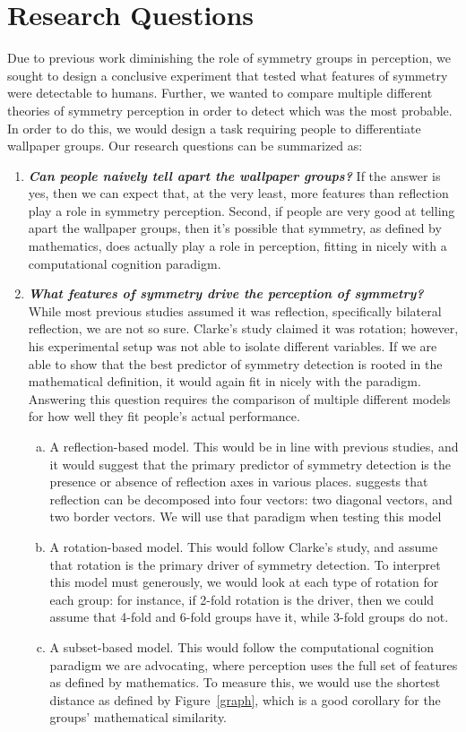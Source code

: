 \section{Research Questions}
Due to previous work diminishing the role of symmetry groups in perception, we sought to design a conclusive experiment that tested what features of symmetry were detectable to humans. Further, we wanted to compare multiple different theories of symmetry perception in order to detect which was the most probable. In order to do this, we would design a task requiring people to differentiate wallpaper groups. Our research questions can be summarized as:

\begin{enumerate}
\item {\textbf{\textit{Can people naively tell apart the wallpaper groups?}} If the answer is yes, then we can expect that, at the very least, more features than reflection play a role in symmetry perception. Second, if people are very good at telling apart the wallpaper groups, then it's possible that symmetry, as defined by mathematics, does actually play a role in perception, fitting in nicely with a computational cognition paradigm.}
\item {\textbf{\textit{What features of symmetry drive the perception of symmetry?}} While most previous studies assumed it was reflection, specifically bilateral reflection, we are not so sure. Clarke's study claimed it was rotation; however, his experimental setup was not able to isolate different variables. If we are able to show that the best predictor of symmetry detection is rooted in the mathematical definition, it would again fit in nicely with the paradigm. Answering this question requires the comparison of multiple different models for how well they fit people's actual performance.}
\begin{enumerate}[a.]
\item {A reflection-based model. This would be in line with previous studies, and it would suggest that the primary predictor of symmetry detection is the presence or absence of reflection axes in various places. \citet{yanxibook} suggests that reflection can be decomposed into four vectors: two diagonal vectors, and two border vectors. We will use that paradigm when testing this model}
\item {A rotation-based model. This would follow Clarke's study, and assume that rotation is the primary driver of symmetry detection. To interpret this model must generously, we would look at each type of rotation for each group: for instance, if 2-fold rotation is the driver, then we could assume that 4-fold and 6-fold groups have it, while 3-fold groups do not.}
\item {A subset-based model. This would follow the computational cognition paradigm we are advocating, where perception uses the full set of features as defined by mathematics. To measure this, we would use the shortest distance as defined by Figure~\ref{graph}, which is a good corollary for the groups' mathematical similarity. }
\end{enumerate}
\end{enumerate}